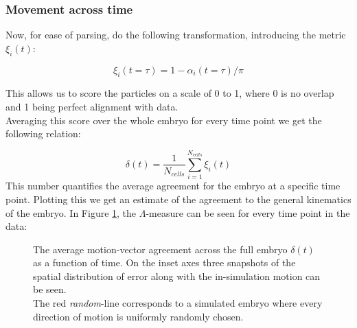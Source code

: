 \subsubsection{Movement across time}

Now, for ease of parsing, do the following transformation, introducing the metric $\xi_i(t)$:

\begin{equation}
    \xi_i(t=\tau) = 1-\alpha_i(t=\tau)/\pi
\end{equation}

This allows us to score the particles on a scale of 0 to 1, where 0 is no overlap and 1 being perfect alignment with data.\\

Averaging this score over the whole embryo for every time point we get the following relation:

\begin{equation}
     \delta(t) = \frac{1}{N_{cells}} \sum_{i=1}^{N_{cells}}\xi_i(t)
\end{equation}
This number quantifies the average agreement for the embryo at a specific time point. Plotting this we get an estimate of the agreement to the general kinematics of the embryo. In Figure \ref{fig:motionAgreement}, the $\Lambda$-measure can be seen for every time point in the data:

\begin{figure}[H]
    \centering
    \caption{The average motion-vector agreement across the full embryo $\delta(t)$ as a function of time. On the inset axes three snapshots of the spatial distribution of error along with the in-simulation motion can be seen.\\
    The red \textit{random}-line corresponds to a simulated embryo where every direction of motion is uniformly randomly chosen.}
    \label{fig:motionAgreement}
\end{figure}



